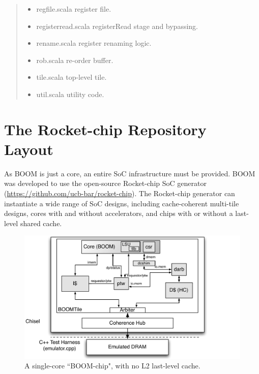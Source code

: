 \begin{quote}
\begin{itemize}
\begin{itemize}
  \item regfile.scala {\footnotesize \color{red} register file.}
  \item registerread.scala {\footnotesize \color{red} registerRead stage and bypassing.}
  \item rename.scala {\footnotesize \color{red} register renaming logic.}
  \item rob.scala {\footnotesize \color{red} re-order buffer.}
  \item tile.scala {\footnotesize \color{red} top-level tile.}
  \item util.scala {\footnotesize \color{red} utility code.}


\end{itemize}
\end{itemize}
\end{quote}




\section{The Rocket-chip Repository Layout}

As BOOM is just a core, an entire SoC infrastructure must be provided.  BOOM was developed to use the open-source Rocket-chip SoC generator (\url{https://github.com/ucb-bar/rocket-chip}). The Rocket-chip generator can instantiate a wide range of SoC designs, including cache-coherent multi-tile designs, cores with and without accelerators, and chips with or without a last-level shared cache. 




\begin{figure}[ht]
	\centering
	\centerline{\includegraphics[scale =.9] {figures/chip}}
	\caption{ \small A single-core ``BOOM-chip", with no L2 last-level cache.}
	\label{fig:boomchip}
\end{figure}



